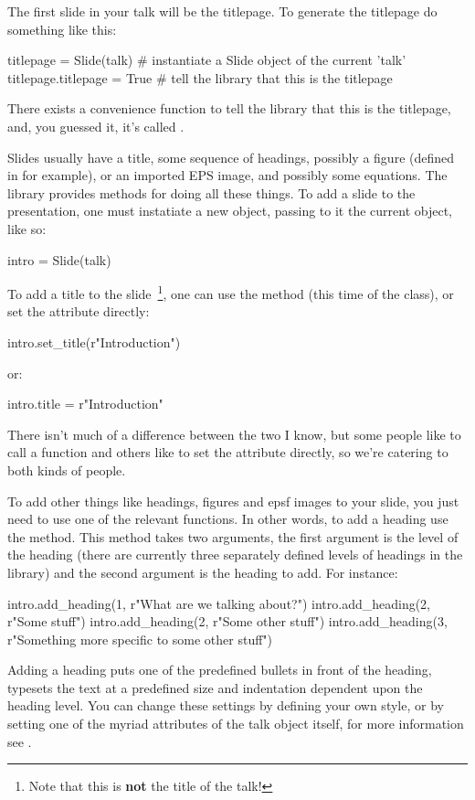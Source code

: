 The first slide in your talk will be the titlepage.  To generate the
titlepage do something like this:
\begin{python}
titlepage = Slide(talk)  # instantiate a Slide object of the current 'talk'
titlepage.titlepage = True  # tell the library that this is the titlepage
\end{python}
There exists a convenience function to tell the library that this is the
titlepage, and, you guessed it, it's called .

Slides usually have a title, some sequence of headings, possibly a figure
(defined in \pyscript for example), or an imported EPS image, and possibly
some equations.  The  library provides methods for doing
all these things.  To add a slide to the presentation, one must instatiate a
new  object, passing to it the current  object, like
so:
\begin{python}
intro = Slide(talk)
\end{python}

To add a title to the slide~\footnote{Note that this is
\textbf{not} the title of the talk!}, one can use the 
method (this time of the  class), or set the 
attribute directly:
\begin{python}
intro.set_title(r"Introduction")
\end{python}
or:
\begin{python}
intro.title = r"Introduction"
\end{python}
There isn't much of a difference between the two I know, but some people
like to call a  function and others like to set the attribute
directly, so we're catering to both kinds of people.

To add other things like headings, figures and epsf images to your slide,
you just need to use one of the relevant  functions.  In other
words, to add a heading use the  method.  This method
takes two arguments, the first argument is the level of the heading (there
are currently three separately defined levels of headings in the library)
and the second argument is the heading to add.  For instance:
\begin{python}
intro.add_heading(1, r"What are we talking about?")
intro.add_heading(2, r"Some stuff")
intro.add_heading(2, r"Some other stuff")
intro.add_heading(3, r"Something more specific to some other stuff")
\end{python}
Adding a heading puts one of the predefined bullets in front of the heading,
typesets the text at a predefined size and indentation dependent upon the
heading level.  You can change these settings by defining your own style, or
by setting one of the myriad attributes of the talk object itself, for more
information see .


